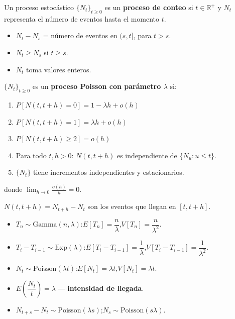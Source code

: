 \begin{defi}{}{}
Un proceso estocástico $\{N_t\}_{t\geq 0}$ es un \textbf{proceso de conteo} si $t\in\mathbb{R}^+$ y $N_t$ representa el número de eventos hasta el momento $t$.
\begin{itemize}
    \item $N_t-N_s$ = número de eventos en $(s,t]$, para $t>s$.
    \item $N_t\geq N_s$ si $t\geq s$.
    \item $N_t$ toma valores enteros.
\end{itemize}
\end{defi}

\begin{defi}{}{}
$\{N_t\}_{t\geq 0}$ es un \textbf{proceso Poisson con parámetro $\lambda$} si:
\begin{enumerate}
    \item $P[N(t,t+h)=0]=1-\lambda h+o(h)$
    \item $P[N(t,t+h)=1]=\lambda h+o(h)$
    \item $P[N(t,t+h)\geq 2]=o(h)$
    \item Para todo $t,h>0$: $N(t,t+h)$ es independiente de $\{N_u:u\leq t\}$.
    \item $\{N_t\}$ tiene incrementos independientes y estacionarios.
\end{enumerate}
donde $\displaystyle\lim_{h\to 0}\frac{o(h)}{h}=0$.
\end{defi}

\begin{nota}
$N(t,t+h)=N_{t+h}-N_t$ son los eventos que llegan en $[t,t+h]$.
\end{nota}

\begin{itemize}
    \item $T_n\sim\mathrm{Gamma}(n,\lambda)$:\quad $E[T_n]=\dfrac{n}{\lambda}$,\quad $V[T_n]=\dfrac{n}{\lambda^2}$.
    \item $T_i-T_{i-1}\sim\mathrm{Exp}(\lambda)$:\quad $E[T_i-T_{i-1}]=\dfrac{1}{\lambda}$,\quad $V[T_i-T_{i-1}]=\dfrac{1}{\lambda^2}$.
    \item $N_t\sim\mathrm{Poisson}(\lambda t)$:\quad $E[N_t]=\lambda t$,\quad $V[N_t]=\lambda t$.
    \item $E\!\left(\dfrac{N_t}{t}\right)=\lambda$ --- \textbf{intensidad de llegada}.
    \item $N_{t+s}-N_t\sim\mathrm{Poisson}(\lambda s)$;\quad $N_s\sim\mathrm{Poisson}(s\lambda)$.
\end{itemize}

